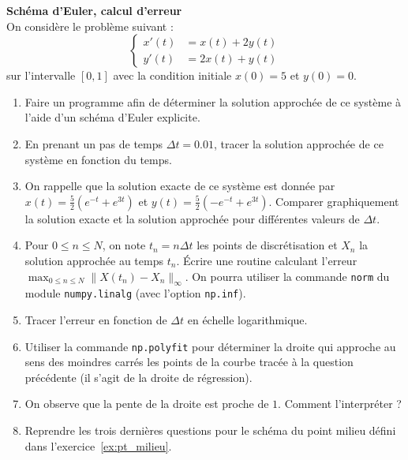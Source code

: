 \documentclass[12pt]{article}
\begin{document}
\begin{exo}
  \label{ex:sch_exp}
  \textbf{Sch\'ema d'Euler, calcul d'erreur} \\
On consid\`ere le probl\`eme suivant :
$$
\left\{
\begin{array}{rl}
x'(t)&=x(t)+2y(t)\\
y'(t)&=2x(t)+y(t)
\end{array}
\right.
$$
sur l'intervalle $[0,1]$ avec la condition initiale $x(0)=5$ et $y(0)=0$.
\begin{enumerate}
\item Faire un programme afin de d\'eterminer la solution approch\'ee de ce syst\`eme \`a l'aide d'un sch\'ema d'Euler explicite. 
\item En prenant un pas de temps $\Delta t = 0.01$, tracer la solution approch\'ee de ce syst\`eme en fonction du temps.
\item On rappelle que la solution exacte de ce syst\`eme est donn\'ee par
  $x(t) = \frac52 (e^{-t} + e^{3t})$ et $y(t) = \frac52 (-e^{-t} + e^{3t})$. Comparer graphiquement la solution exacte et la solution approch\'ee pour diff\'erentes valeurs de $\Delta t$.
\item Pour $0\leq n \leq N$, on note $t_n=n\Delta t$ les points de discr\'etisation et $X_n$ la solution approch\'ee au temps $t_n$. \'Ecrire une routine calculant l'erreur $\max_{0\leq n \leq N}\|X(t_n)-X_n\|_{\infty}$. On pourra utiliser la commande \texttt{norm} du module \texttt{numpy.linalg} (avec l'option \texttt{np.inf}). 
\item Tracer  l'erreur en fonction de $\Delta t$ en \'echelle logarithmique. 
\item Utiliser la commande \texttt{np.polyfit} pour d\'eterminer la droite qui approche au sens des moindres carr\'es les points de la courbe tracée à la question précédente  (il s'agit de la droite de r\'egression). 
\item On observe que la pente de la droite est proche de $1$. Comment l'interpr\'eter ?
\item Reprendre les trois derni\`eres questions
  pour le sch\'ema du point milieu d\'efini dans l'exercice~\ref{ex:pt_milieu}.
\end{enumerate}
\end{exo}
\newpage
\end{document}
